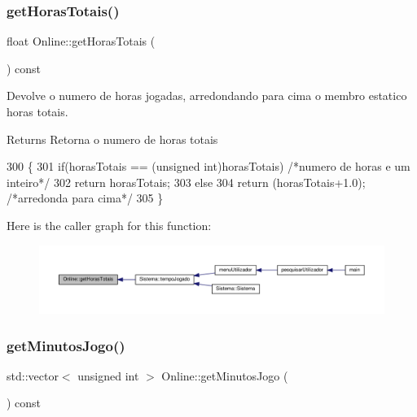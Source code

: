 \subsubsection{\texorpdfstring{get\+Horas\+Totais()}{getHorasTotais()}}
{\footnotesize\ttfamily float Online\+::get\+Horas\+Totais (\begin{DoxyParamCaption}{ }\end{DoxyParamCaption}) const}



Devolve o numero de horas jogadas, arredondando para cima o membro estatico horas totais. 

\begin{DoxyReturn}{Returns}
Retorna o numero de horas totais 
\end{DoxyReturn}

\begin{DoxyCode}
300  \{
301     \textcolor{keywordflow}{if}(horasTotais == (\textcolor{keywordtype}{unsigned} \textcolor{keywordtype}{int})horasTotais) \textcolor{comment}{/*numero de horas e um inteiro*/}
302         \textcolor{keywordflow}{return} horasTotais;
303     \textcolor{keywordflow}{else}
304         \textcolor{keywordflow}{return} (horasTotais+1.0); \textcolor{comment}{/*arredonda para cima*/}
305 \}
\end{DoxyCode}
Here is the caller graph for this function\+:
\nopagebreak
\begin{figure}[H]
\begin{center}
\leavevmode
\includegraphics[width=350pt]{classOnline_ad0a23d2f1a2f804479ff346be0fdc686_icgraph}
\end{center}
\end{figure}
\mbox{\label{classOnline_a4ab18dfdaa0af23cda8f5268a9968887}} 
\subsubsection{\texorpdfstring{get\+Minutos\+Jogo()}{getMinutosJogo()}}
{\footnotesize\ttfamily std\+::vector$<$ unsigned int $>$ Online\+::get\+Minutos\+Jogo (\begin{DoxyParamCaption}{ }\end{DoxyParamCaption}) const}



